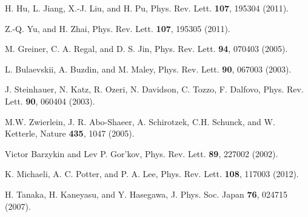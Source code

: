 \documentclass[prl,showpacs,twocolumn]{revtex4}
\begin{document}
\begin{thebibliography}{99}
 H. Hu, L. Jiang, X.-J. Liu, and H. Pu, Phys. Rev. Lett.
\textbf{107}, 195304 (2011).

 Z.-Q. Yu, and H. Zhai, Phys. Rev. Lett. \textbf{107}, 195305
(2011).

 M. Greiner, C. A. Regal, and D. S. Jin, Phys. Rev. Lett.
\textbf{94}, 070403 (2005).

 L. Bulaevskii, A. Buzdin, and M. Maley, Phys. Rev.
Lett. \textbf{90}, 067003 (2003).

 J. Steinhauer, N. Katz, R. Ozeri, N. Davidson, C. Tozzo, F.
Dalfovo, Phys. Rev. Lett. \textbf{90}, 060404 (2003).

 M.W. Zwierlein, J. R. Abo-Shaeer, A. Schirotzek, C.H.
Schunck, and W. Ketterle, Nature \textbf{435}, 1047 (2005).

 Victor Barzykin and Lev P. Gor'kov, Phys. Rev. Lett. \textbf{89},
		227002 (2002).

 K. Michaeli, A. C. Potter, and P. A. Lee, Phys. Rev. Lett.
\textbf{108}, 117003 (2012).

 H. Tanaka, H. Kaneyasu, and Y. Hasegawa, J. Phys. Soc. Japan
\textbf{76}, 024715 (2007).
\end{thebibliography}
\end{document}
